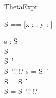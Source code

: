 \begin{zsection}
  \SECTION ThetaExpr
\end{zsection}

\begin{zed}
  S == [x : \nat; y : \power \nat]
\end{zed}

\begin{axdef}
  s : S\\
  S\\
  S~'\\
  S~'!'!?
\where
  s = \theta S~'\\
  \theta S = \theta S~'\\
  \theta S = \theta S~'!'!?
\end{axdef}
